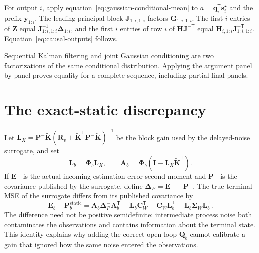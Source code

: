 \documentclass[11pt]{article}
\newcommand{\ve}[1]{\boldsymbol{#1}}
\newcommand{\tr}{\mathsf{T}}
\begin{document}
For output $i$, apply equation~\eqref{eq:gaussian-conditional-mean} to
$a=\ve{q}_i^{\tr}\ve{s}_i^\star$ and the prefix $\ve{y}_{1:i}$.  The leading principal block
$\ve{J}_{1:i,1:i}$ factors $\ve{G}_{1:i,1:i}$.  The first $i$ entries of
$\ve{Z}$ equal $\ve{J}_{1:i,1:i}^{-1}\ve{\Delta}_{1:i}$, and the first $i$ entries of row $i$
of $\ve{H}\ve{J}^{-\tr}$ equal
$\ve{H}_{i,1:i}\ve{J}_{1:i,1:i}^{-\tr}$.  Equation~\eqref{eq:causal-outputs} follows.

Sequential Kalman filtering and joint Gaussian conditioning are two factorizations of the same
conditional distribution.  Applying the argument panel by panel proves equality for a complete
sequence, including partial final panels.

\section{The exact-static discrepancy}

Let $\ve{L}_X=\ve{P}^-\widetilde{\ve{K}}
(\ve{R}_v+\widetilde{\ve{K}}^{\tr}\ve{P}^-
\widetilde{\ve{K}})^{-1}$ be the block gain used by the delayed-noise surrogate, and set
\begin{equation}
  \ve{L}_b=\ve{\Phi}_b\ve{L}_X,
  \qquad
  \ve{A}_b=\ve{\Phi}_b
  (\ve{I}-\ve{L}_X\widetilde{\ve{K}}^{\tr}).
\end{equation}
If $\ve{E}^-$ is the actual incoming estimation-error second moment and
$\ve{P}^-$ is the covariance published by the surrogate, define
$\ve{\Delta}_P^-=\ve{E}^--\ve{P}^-$.  The true terminal MSE of the surrogate differs from its
published covariance by
\begin{equation}
  \ve{E}_b-\ve{P}_b^{\mathrm{static}}
  =\ve{A}_b\ve{\Delta}_P^-\ve{A}_b^{\tr}
   -\ve{L}_b\ve{C}_W^{\tr}
   -\ve{C}_W\ve{L}_b^{\tr}
   +\ve{L}_b\ve{\Sigma}_W\ve{L}_b^{\tr}.
\end{equation}
The difference need not be positive semidefinite: intermediate process noise both contaminates
the observations and contains information about the terminal state.  This identity explains why
adding the correct open-loop $\ve{Q}_b$ cannot calibrate a gain that ignored how the same noise
entered the observations.
\end{document}
